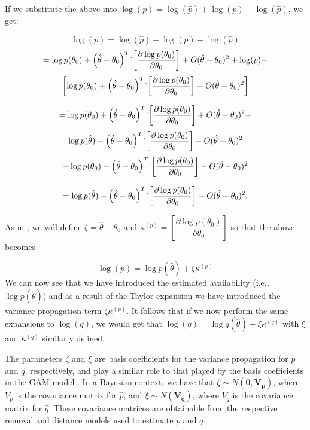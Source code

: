 If we substitute the above into $\log(p) = \log(\hat{p}) + \log(p) - \log(\hat{p})$, we get:

$$	\log(p)  = \log(\hat{p}) + \log(p) - \log(\hat{p}) $$
$$ = \log p(\theta_0) + \left( \hat{\theta} - \theta_0 \right)^T \dot \\ \left[ \dfrac{\partial \log p({\theta_0})}{\partial {\theta_0}}  \right] + O(\hat{\theta} - \theta_0)^2 + \log(p) - $$
$$ \left[ \log p(\theta_0) + \left( \hat{\theta} - \theta_0 \right)^T \dot \\ \left[ \dfrac{\partial \log p({\theta_0})}{\partial {\theta_0}}  \right] + O(\hat{\theta} - \theta_0)^2  \right] $$

$$ = \log p(\theta_0) + \left( \hat{\theta} - \theta_0 \right)^T \dot \\ \left[ \dfrac{\partial \log p({\theta_0})}{\partial {\theta_0}}  \right] + O(\hat{\theta} - \theta_0)^2 + $$
$$\log p(\hat{\theta}) - \left( \hat{\theta} - \theta_0 \right)^T \dot \\ \left[ \dfrac{\partial \log p({\theta_0})}{\partial {\theta_0}}  \right] - O(\hat{\theta} - \theta_0)^2 $$
$$ - \log p(\theta_0) - \left( \hat{\theta} - \theta_0 \right)^T \dot \\ \left[ \dfrac{\partial \log p({\theta_0})}{\partial {\theta_0}}  \right] - O(\hat{\theta} - \theta_0)^2  $$

$$ = \log p(\hat{\theta}) - \left( \hat{\theta} - \theta_0 \right)^T \dot \\ \left[ \dfrac{\partial \log p({\theta_0})}{\partial {\theta_0}}  \right] - O(\hat{\theta} - \theta_0)^2. $$

As in \citet{bravington_variance_2021}, we will define $\zeta = \hat{\theta} - \theta_0$ and $\kappa^{(p)} = \left[ \dfrac{\partial \log p({\theta_0})}{\partial {\theta_0}}  \right]$ so that the above becomes

$$\log(p) = \log p(\hat{\theta}) + \zeta\kappa^{(p)}$$
We can now see that we have introduced the estimated availability (i.e., $\log p(\hat{\theta})$) and as a result of the Taylor expansion we have introduced the variance propagation term $\zeta\kappa^{(p)}$.
It follows that if we now perform the same expansions to $\log(q)$, we would get that $\log(q) = \log q(\hat{\theta}) + \xi\kappa^{(q)}$ with $\xi$ and $\kappa^{(q)}$ similarly defined.

\par The parameters $\zeta$ and $\xi$ are basis coefficients for the variance propagation for $\hat{p}$ and $\hat{q}$, respectively, and play a similar role to that played by the basis coefficients in the GAM model \citep{bravington_variance_2021}. 
In a Bayesian context, we have that $\zeta \sim N(\boldsymbol{0}, \boldsymbol{V_p})$, where $V_p$ is the covariance matrix for $\hat{p}$, and $\xi \sim N(\boldsymbol{V_q})$, where $V_q$ is the covariance matrix for $\hat{q}$.
These covariance matrices are obtainable from the respective removal and distance models used to estimate $p$ and $q$.

